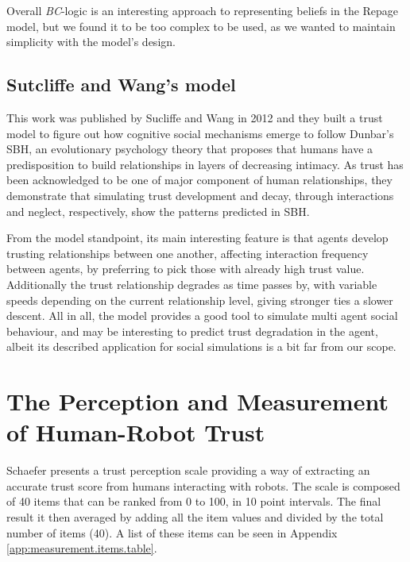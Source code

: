 Overall \textit{BC}-logic is an interesting approach to representing beliefs in the Repage model, but we found it to be too complex to be used, as we wanted to maintain simplicity with the model's design.

\subsection{Sutcliffe and Wang's model}
\label{subsec:Related work:Sutcliffe and Wang}
This work was published by Sucliffe and Wang in 2012\cite{Sutcliffe2012} and they built a trust model to figure out how cognitive social mechanisms emerge to follow Dunbar's \ac{SBH}\cite{Dunbar1998}, an evolutionary psychology theory that proposes that humans have a predisposition to build relationships in layers of decreasing intimacy. As trust has been acknowledged to be one of major component of human relationships, they demonstrate that simulating trust development and decay, through interactions and neglect, respectively, show the patterns predicted in \ac{SBH}.

From the model standpoint, its main interesting feature is that agents develop trusting relationships between one another, affecting interaction frequency between agents, by preferring to pick those with already high trust value. Additionally the trust relationship degrades as time passes by, with variable speeds depending on the current relationship level, giving stronger ties a slower descent. All in all, the model provides a good tool to simulate multi agent social behaviour, and may be interesting to predict trust degradation in the agent, albeit its described application for social simulations is a bit far from our scope.


\section{The Perception and Measurement of Human-Robot Trust}
\label{sec:Related work:The Perception and Measurement of Human-Robot Trust}

Schaefer\cite{Schaefer2009} presents a trust perception scale providing a way of extracting an accurate trust score from humans interacting with robots. The scale is composed of 40 items that can be ranked from 0 to 100, in 10 point intervals. The final result it then averaged by adding all the item values and divided by the total number of items (40). A list of these items can be seen in Appendix \ref{app:measurement.items.table}.

